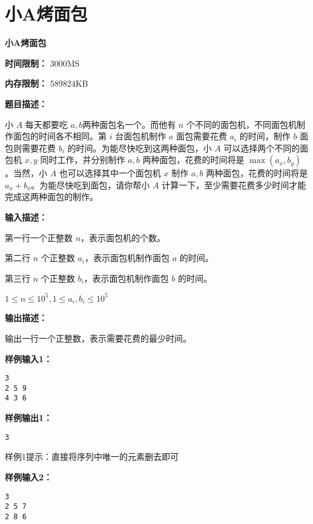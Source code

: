 \documentclass[a4paper]{ctexart}
\begin{document}
\section{小A烤面包}

\begin{center}
	\Large \textbf{小A烤面包}
\end{center}

\noindent\textbf{时间限制：} 3000MS

\noindent\textbf{内存限制：} 589824KB

\vspace{10pt}

\noindent\textbf{题目描述：}

小 $A$ 每天都要吃 $a, b$两种面包名一个。而他有 $n$ 个不同的面包机，不同面包机制作面包的时间各不相同。第 $i$ 台面包机制作 $a$ 面包需要花费 $a_i$ 的时间，制作 $b$ 面包则需要花费 $b_i$ 的时间。为能尽快吃到这两种面包，小 $A$ 可以选择两个不同的面包机 $x, y$ 同时工作，并分别制作 $a,b$ 两种面包，花费的时间将是 $\max(a_x, b_y)$。当然，小 $A$ 也可以选择其中一个面包机 $x$ 制作 $a,b$ 两种面包，花费的时间将是 $a_x + b_x$。为能尽快吃到面包，请你帮小 $A$ 计算一下，至少需要花费多少时间才能完成这两种面包的制作。

\noindent\textbf{输入描述：}

第一行一个正整数 $n$，表示面包机的个数。

第二行 $n$ 个正整数 $a_i$，表示面包机制作面包 $a$ 的时间。

第三行 $n$ 个正整数 $b_i$，表示面包机制作面包 $b$ 的时间。

$1 \leq n \leq 10^5, 1 \leq a_i, b_i \leq 10^5$

\noindent\textbf{输出描述：} 

输出一行一个正整数，表示需要花费的最少时间。

\noindent\textbf{样例输入1：}

\lstset{numbers=none}
\begin{lstlisting}
3
2 5 9
4 3 6
\end{lstlisting}
\lstset{numbers=left}

\noindent\textbf{样例输出1：}
\lstset{numbers=none}
\begin{lstlisting}
3
\end{lstlisting}
\lstset{numbers=left}

样例1提示：直接将序列中唯一的元素删去即可

\noindent\textbf{样例输入2：}

\lstset{numbers=none}
\begin{lstlisting}
3
2 5 7
2 8 6
\end{lstlisting}
\lstset{numbers=left}
\end{document}
